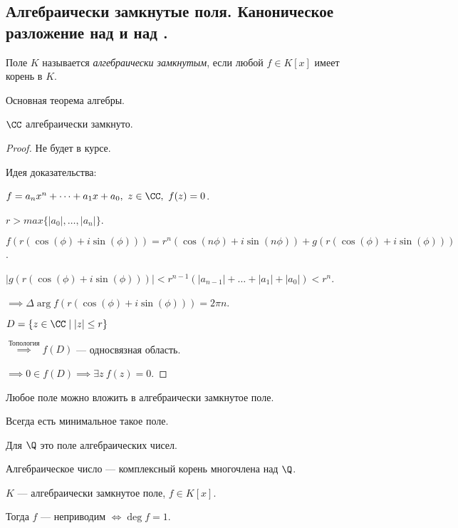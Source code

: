 \subsection{Алгебраически замкнутые поля. Каноническое разложение над \CC и над \R.}

\begin{defn}
    Поле $K$ называется \emph{алгебраически замкнутым}, если любой $f \in K[x]$ имеет корень в $K$.
\end{defn}

\begin{theorem}
    Основная теорема алгебры.

    $\CC$ алгебраически замкнуто.
\end{theorem}

\begin{proof}
     Не будет в курсе.

     Идея доказательства:

     $f = a_nx^n + \dots + a_1x + a_0,~ z \in \CC,~ f(z) = 0$.

     $r > max\{|a_0|, \ldots, |a_n|\}$.

     $f(r(\cos(\phi) + i\sin(\phi))) = r^n(\cos(n\phi) + i\sin(n\phi)) + g(r(\cos(\phi) + i\sin(\phi)))$.

     $|g(r(\cos(\phi) + i\sin(\phi)))| < r^{n - 1}(|a_{n - 1}| + \ldots + |a_1| + |a_0|) < r^n$.

     $\implies \Delta \arg f(r(\cos(\phi) + i\sin(\phi))) = 2\pi n$.

     $D = \{z \in \CC \mid |z| \leq r\}$

     $\overset{\text{Топология}}{\implies} f(D)$ --- односвязная область.

     $\implies 0 \in f(D) \implies \exists z~f(z) = 0$.
\end{proof}

\begin{notice} 
    Любое поле можно вложить в алгебраически замкнутое поле. 
    
    Всегда есть минимальное такое поле.

    Для $\Q$ это поле алгебраических чисел.

    Алгебраическое число --- комплексный корень многочлена над $\Q$.
\end{notice}

\begin{theorem-non}
    $K$ --- алгебраически замкнутое поле, $f \in K[x]$.

    Тогда $f$ --- неприводим $\iff \deg f = 1$.
\end{theorem-non}

